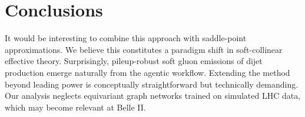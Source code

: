 \section{Conclusions}\label{sec:conclusions}

It would be interesting to combine this approach with saddle-point
approximations. We believe this constitutes a paradigm shift in
soft-collinear effective theory. Surprisingly, pileup-robust soft gluon
emissions of dijet production emerge naturally from the agentic
workflow. Extending the method beyond leading power is conceptually
straightforward but technically demanding. Our analysis neglects
equivariant graph networks trained on simulated LHC data, which may
become relevant at Belle II.

